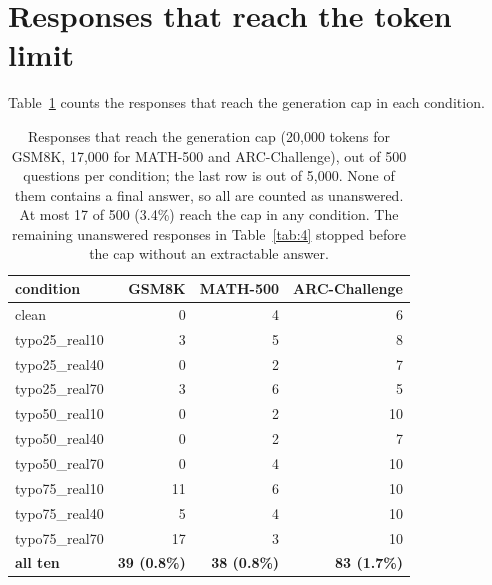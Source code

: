 \documentclass[11pt]{article}
\begin{document}
\section{Responses that reach the token limit}\label{app:tokenlimit}

Table~\ref{tab:9} counts the responses that reach the generation cap in each condition.

\begin{table}[t]
\centering
\small
\begin{tabular}{lrrr}
\toprule
\textbf{condition} & \textbf{GSM8K} & \textbf{MATH-500} & \textbf{ARC-Challenge} \\
\midrule
clean & 0 & 4 & 6 \\
typo25\_real10 & 3 & 5 & 8 \\
typo25\_real40 & 0 & 2 & 7 \\
typo25\_real70 & 3 & 6 & 5 \\
typo50\_real10 & 0 & 2 & 10 \\
typo50\_real40 & 0 & 2 & 7 \\
typo50\_real70 & 0 & 4 & 10 \\
typo75\_real10 & 11 & 6 & 10 \\
typo75\_real40 & 5 & 4 & 10 \\
typo75\_real70 & 17 & 3 & 10 \\
\midrule
\textbf{all ten} & \textbf{39 (0.8\%)} & \textbf{38 (0.8\%)} & \textbf{83 (1.7\%)} \\
\bottomrule
\end{tabular}
\caption{Responses that reach the generation cap (20,000 tokens for GSM8K, 17,000 for MATH-500 and ARC-Challenge), out of 500 questions per condition; the last row is out of 5,000. None of them contains a final answer, so all are counted as unanswered. At most 17 of 500 (3.4\%) reach the cap in any condition. The remaining unanswered responses in Table~\ref{tab:4} stopped before the cap without an extractable answer.}
\label{tab:9}
\end{table}
\end{document}
